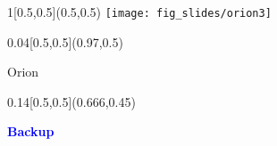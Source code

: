 \documentclass[xcolor=dvipsnames,professionalfonts, aspectratio=169]{beamer}
\begin{document}
\begin{frame}[plain]
  \begin{textblock}{1}[0.5,0.5](0.5,0.5)
    \centering
    \texttt{[image: fig\_slides/orion3]}
  \end{textblock}



  \begin{textblock}{0.04}[0.5,0.5](0.97,0.5)
      \begin{block}{}
            \begin{sideways}
              \color{Blue}
              \centering
              \Large Orion
            \end{sideways}
          \end{block}
  \end{textblock}
\end{frame}
\egroup




\appendix

\bgroup
{}
\begin{frame}[plain]%
  \begin{textblock}{0.14}[0.5,0.5](0.666,0.45)
    \begin{block}{}
      \centering
      \textcolor{Blue}{\Large \bf Backup}
    \end{block}
  \end{textblock}
\end{frame}
\egroup
\end{document}
